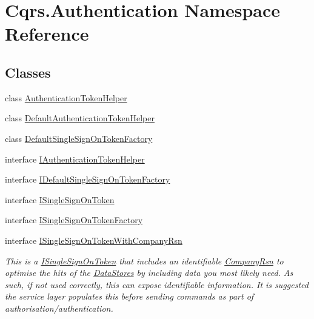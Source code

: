 \hypertarget{namespaceCqrs_1_1Authentication}{}\section{Cqrs.\+Authentication Namespace Reference}
\label{namespaceCqrs_1_1Authentication}
\subsection*{Classes}
\begin{DoxyCompactItemize}
\item 
class \hyperlink{classCqrs_1_1Authentication_1_1AuthenticationTokenHelper}{Authentication\+Token\+Helper}
\item 
class \hyperlink{classCqrs_1_1Authentication_1_1DefaultAuthenticationTokenHelper}{Default\+Authentication\+Token\+Helper}
\item 
class \hyperlink{classCqrs_1_1Authentication_1_1DefaultSingleSignOnTokenFactory}{Default\+Single\+Sign\+On\+Token\+Factory}
\item 
interface \hyperlink{interfaceCqrs_1_1Authentication_1_1IAuthenticationTokenHelper}{I\+Authentication\+Token\+Helper}
\item 
interface \hyperlink{interfaceCqrs_1_1Authentication_1_1IDefaultSingleSignOnTokenFactory}{I\+Default\+Single\+Sign\+On\+Token\+Factory}
\item 
interface \hyperlink{interfaceCqrs_1_1Authentication_1_1ISingleSignOnToken}{I\+Single\+Sign\+On\+Token}
\item 
interface \hyperlink{interfaceCqrs_1_1Authentication_1_1ISingleSignOnTokenFactory}{I\+Single\+Sign\+On\+Token\+Factory}
\item 
interface \hyperlink{interfaceCqrs_1_1Authentication_1_1ISingleSignOnTokenWithCompanyRsn}{I\+Single\+Sign\+On\+Token\+With\+Company\+Rsn}
\begin{DoxyCompactList}\small\item\em This is a \hyperlink{interfaceCqrs_1_1Authentication_1_1ISingleSignOnToken}{I\+Single\+Sign\+On\+Token} that includes an identifiable \hyperlink{interfaceCqrs_1_1Authentication_1_1ISingleSignOnTokenWithCompanyRsn_a26ffa6ca2e583f0ecc440b68fe3edd52}{Company\+Rsn} to optimise the hits of the \hyperlink{}{Data\+Stores} by including data you most likely need. As such, if not used correctly, this can expose identifiable information. It is suggested the service layer populates this before sending commands as part of authorisation/authentication. \end{DoxyCompactList}\item 

\end{DoxyCompactItemize}
